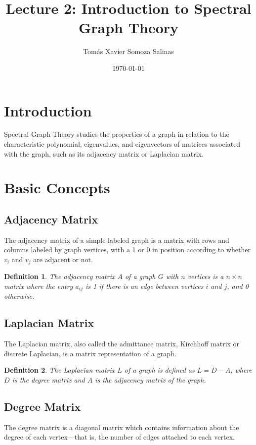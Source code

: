 \documentclass{article}
\newtheorem{definition}{Definition}
\begin{document}
	
	\title{Lecture 2: Introduction to Spectral Graph Theory}
	\author{Tomás Xavier Somoza Salinas}
	\date{\today}
	\maketitle
	
	\section{Introduction}
	Spectral Graph Theory studies the properties of a graph in relation to the characteristic polynomial, eigenvalues, and eigenvectors of matrices associated with the graph, such as its adjacency matrix or Laplacian matrix.
	
	\section{Basic Concepts}
	
	\subsection{Adjacency Matrix}
	The adjacency matrix of a simple labeled graph is a matrix with rows and columns labeled by graph vertices, with a 1 or 0 in position according to whether \(v_i\) and \(v_j\) are adjacent or not.
	
	\begin{definition}
		The \textit{adjacency matrix} \(A\) of a graph \(G\) with \(n\) vertices is a \(n \times n\) matrix where the entry \(a_{ij}\) is 1 if there is an edge between vertices \(i\) and \(j\), and 0 otherwise.
	\end{definition}
	
	\subsection{Laplacian Matrix}
	The Laplacian matrix, also called the admittance matrix, Kirchhoff matrix or discrete Laplacian, is a matrix representation of a graph.
	
	\begin{definition}
		The \textit{Laplacian matrix} \(L\) of a graph is defined as \(L = D - A\), where \(D\) is the degree matrix and \(A\) is the adjacency matrix of the graph.
	\end{definition}
	
\subsection{Degree Matrix}
The degree matrix is a diagonal matrix which contains information about the degree of each vertex—that is, the number of edges attached to each vertex.
\end{document}
